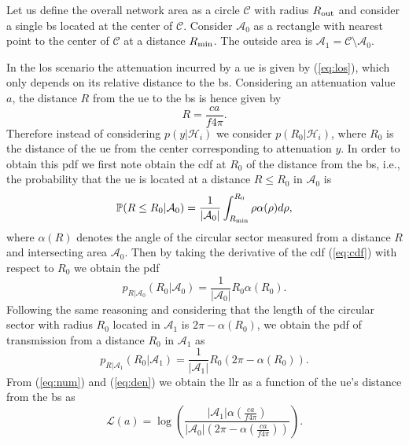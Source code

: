 \documentclass[conference]{IEEEtran}
\begin{document}
Let us define the overall network area as a circle $\mathcal{C}$ with radius $R_{\rm out}$ and consider a single \ac{bs} located at the center of $\mathcal{C}$. Consider $\mathcal{A}_{0}$ as a rectangle with nearest point to the center of $\mathcal{C}$ at a distance $R_{\rm min}$. The outside area is $\mathcal{A}_1 = \mathcal{C} \setminus \mathcal{A}_0$.

In the \ac{los} scenario the attenuation incurred by a \ac{ue} is given by (\ref{eq:los}), which only depends on its relative distance to the \ac{bs}. Considering an attenuation value $a$, the distance $R$ from the \ac{ue} to the \ac{bs} is hence given by 
\begin{equation}
    R = \frac{c a}{f 4 \pi}.
\end{equation}
Therefore instead of considering $p(y|\mathcal H_i)$ we consider $p(R_0|\mathcal H_i)$, where $R_0$ is the distance of the \ac{ue} from the center corresponding to attenuation $y$. In order to obtain this \ac{pdf} we first note obtain the \ac{cdf} at $R_0$ of the distance from the \ac{bs}, i.e.,  the probability that the \ac{ue} is located at a distance $R\le R_0$ in $\mathcal{A}_0$ is
\begin{equation}\label{eq:cdf}
     \mathbb{P}(R \le R_0|\mathcal{A}_0) = \frac{1}{|\mathcal{A}_0|}\int_{R_{\rm min}}^{R_0} \rho \alpha(\rho) d\rho,
\end{equation}
where $\alpha(R)$ denotes the angle of the circular sector measured from a distance $R$ and intersecting area $\mathcal{A}_0$. Then by taking the derivative of the \ac{cdf} (\ref{eq:cdf}) with respect to $R_0$ we obtain the \ac{pdf} 
\begin{equation}\label{eq:num}
    p_{R|\mathcal{A}_0}(R_0|\mathcal{A}_0) = \frac{1}{|\mathcal{A}_0|}R_0\alpha(R_0).
\end{equation}
Following the same reasoning and considering that the length of the circular sector with radius $R_0$ located in $\mathcal{A}_1$ is $2\pi - \alpha(R_0)$, we obtain the \ac{pdf} of transmission from a distance $R_0$ in $\mathcal{A}_1$ as
\begin{equation}\label{eq:den}
     p_{R|\mathcal{A}_1}(R_0|\mathcal{A}_1) = \frac{1}{|\mathcal{A}_1|}R_0\left(2\pi-\alpha(R_0)\right).
\end{equation}
From (\ref{eq:num}) and (\ref{eq:den}) we obtain the \ac{llr} as a function of the \ac{ue}'s distance from the \ac{bs} as 
\begin{equation}
    \mathcal{L}(a)=\log\left(\frac{|\mathcal{A}_1|\alpha(\frac{c a}{f 4 \pi})}{|\mathcal{A}_0|\left(2\pi-\alpha(\frac{c a}{f 4 \pi})\right)}\right).
\end{equation}
\end{document}
